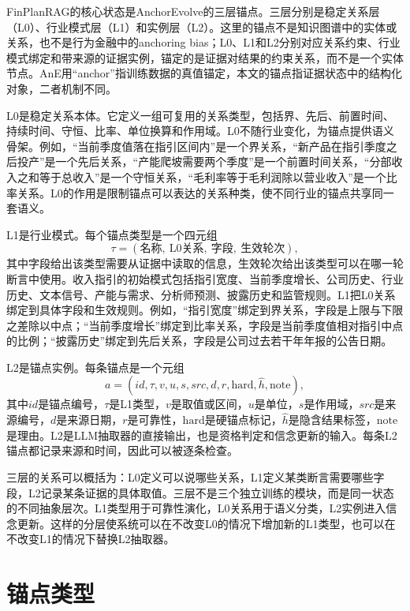 FinPlanRAG的核心状态是AnchorEvolve的三层锚点。三层分别是稳定关系层（L0）、行业模式层（L1）和实例层（L2）。这里的锚点不是知识图谱中的实体或关系，也不是行为金融中的anchoring bias；L0、L1和L2分别对应关系约束、行业模式绑定和带来源的证据实例，锚定的是证据对结果的约束关系，而不是一个实体节点。AnE用“anchor”指训练数据的真值锚定，本文的锚点指证据状态中的结构化对象，二者机制不同\citep{wang2026ane}。

L0是稳定关系本体。它定义一组可复用的关系类型，包括界、先后、前置时间、持续时间、守恒、比率、单位换算和作用域。L0不随行业变化，为锚点提供语义骨架。例如，“当前季度值落在指引区间内”是一个界关系，“新产品在指引季度之后投产”是一个先后关系，“产能爬坡需要两个季度”是一个前置时间关系，“分部收入之和等于总收入”是一个守恒关系，“毛利率等于毛利润除以营业收入”是一个比率关系。L0的作用是限制锚点可以表达的关系种类，使不同行业的锚点共享同一套语义。

L1是行业模式。每个锚点类型是一个四元组
\begin{equation}
\tau=(\text{名称},\ \text{L0关系},\ \text{字段},\ \text{生效轮次}),
\label{eq:l1}
\end{equation}
其中字段给出该类型需要从证据中读取的信息，生效轮次给出该类型可以在哪一轮断言中使用。收入指引的初始模式包括指引宽度、当前季度增长、公司历史、行业历史、文本信号、产能与需求、分析师预测、披露历史和监管规则。L1把L0关系绑定到具体字段和生效规则。例如，“指引宽度”绑定到界关系，字段是上限与下限之差除以中点；“当前季度增长”绑定到比率关系，字段是当前季度值相对指引中点的比例；“披露历史”绑定到先后关系，字段是公司过去若干年年报的公告日期。

L2是锚点实例。每条锚点是一个元组
\begin{equation}
a=(id,\tau,v,u,s,src,d,r,\text{hard},\hat h,\text{note}),
\label{eq:l2}
\end{equation}
其中$id$是锚点编号，$\tau$是L1类型，$v$是取值或区间，$u$是单位，$s$是作用域，$src$是来源编号，$d$是来源日期，$r$是可靠性，$\text{hard}$是硬锚点标记，$\hat h$是隐含结果标签，$\text{note}$是理由。L2是LLM抽取器的直接输出，也是资格判定和信念更新的输入。每条L2锚点都记录来源和时间，因此可以被逐条检查。

三层的关系可以概括为：L0定义可以说哪些关系，L1定义某类断言需要哪些字段，L2记录某条证据的具体取值。三层不是三个独立训练的模块，而是同一状态的不同抽象层次。L1类型用于可靠性演化，L0关系用于语义分类，L2实例进入信念更新。这样的分层使系统可以在不改变L0的情况下增加新的L1类型，也可以在不改变L1的情况下替换L2抽取器。

\section{锚点类型}

